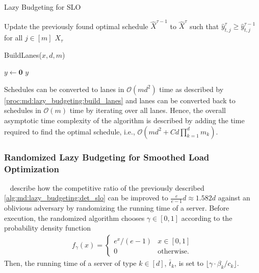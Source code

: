 \begin{algorithm}
    \caption{Lazy Budgeting for SLO~\cite{Albers2021}}\label{alg:md:lazy_budgeting:det_slo}
    Update the previously found optimal schedule $\hat{X}^{\tau-1}$ to $\hat{X}^{\tau}$ such that $\hat{y}_{t,j}^{\tau} \geq \hat{y}_{t,j}^{\tau-1}$ for all  $j \in [m]$\;
    \Return $X_{\tau}$\;
\end{algorithm}

\begin{function}
	\caption{BuildLanes($x, d, m$)}\label{proc:md:lazy_budgeting:build_lanes}
	$y \gets \mathbf{0}$\;
    \Return $y$\;
\end{function}

Schedules can be converted to lanes in $\mathcal{O}(m d^2)$ time as described by \ref{proc:md:lazy_budgeting:build_lanes} and lanes can be converted back to schedules in $\mathcal{O}(m)$ time by iterating over all lanes. Hence, the overall asymptotic time complexity of the algorithm is described by adding the time required to find the optimal schedule, i.e., $\mathcal{O}(m d^2 + C d \prod_{k=1}^d m_k)$.

\subsubsection{Randomized Lazy Budgeting for Smoothed Load Optimization}

\citeauthor{Albers2021}~\cite{Albers2021} describe how the competitive ratio of the previously described \cref{alg:md:lazy_budgeting:det_slo} can be improved to $\frac{e}{e-1}d \approx 1.582d$ against an oblivious adversary by randomizing the running time of a server. Before execution, the randomized algorithm chooses $\gamma \in [0,1]$ according to the probability density function \begin{align*}
    f_{\gamma}(x) = \begin{cases}
        e^x / (e-1) & x \in [0,1] \\
        0 & \text{otherwise}.
    \end{cases}
\end{align*} Then, the running time of a server of type $k \in [d]$, $\bar{t}_k$, is set to $\lfloor \gamma \cdot \beta_k / c_k \rfloor$.

